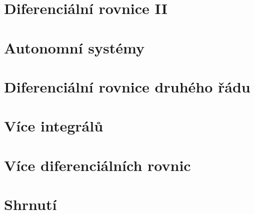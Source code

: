 \section{Diferenciální rovnice II}

\section{Autonomní systémy}

\section{Diferenciální rovnice druhého řádu}

\section{Více integrálů}

\section{Více diferenciálních rovnic}

\section{Shrnutí}






